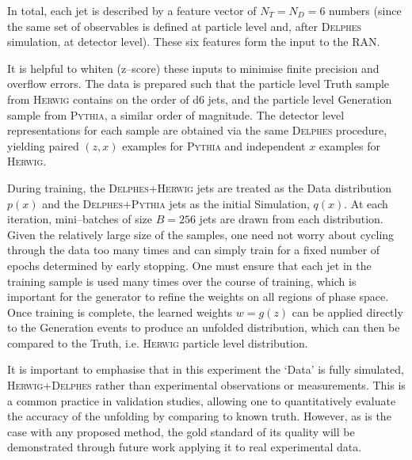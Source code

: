 {{            In total, each jet is described by a feature vector of $N_T = N_D = 6$ numbers (since the same set of observables is defined at particle level and, after \textsc{Delphes} simulation, at detector level).
            These six features form the input to the RAN.
            
            It is helpful to whiten (z--score) these inputs to minimise finite precision and overflow errors.
             The data is prepared such that the particle level Truth sample from \textsc{Herwig} contains on the order of \num{d6} jets, and the  particle level Generation sample from \textsc{Pythia}, a similar order of magnitude.
            The detector level representations for each sample are obtained via the same \textsc{Delphes} procedure, yielding paired $(z, x)$ examples for \textsc{Pythia} and independent $x$ examples for \textsc{Herwig}.
            
            During training, the \textsc{Delphes+Herwig} jets are treated as the Data distribution $p(x)$ and the \textsc{Delphes+Pythia} jets as the initial Simulation, $q(x)$.
            At each iteration, mini--batches of size $B=256$ jets are drawn from each distribution.
            Given the relatively large size of the samples, one need not worry about cycling through the data too many times and can simply train for a fixed number of epochs determined by early stopping.
            One must ensure that each jet in the training sample is used many times over the course of training, which is important for the generator to refine the weights on all regions of phase space.
            Once training is complete, the learned weights $w = g(z)$ can be applied directly to the Generation events to produce an unfolded distribution, which can then be compared to the Truth, i.e. \textsc{Herwig} particle level distribution.
            
            It is important to emphasise that in this experiment the `Data' is fully simulated, \textsc{Herwig+Delphes} rather than experimental observations or measurements.
            This is a common practice in validation studies, allowing one to quantitatively evaluate the accuracy of the unfolding by comparing to known truth.
            However, as is the case with any proposed method, the gold standard of its quality will be demonstrated through future work applying it to real experimental data.

}}
